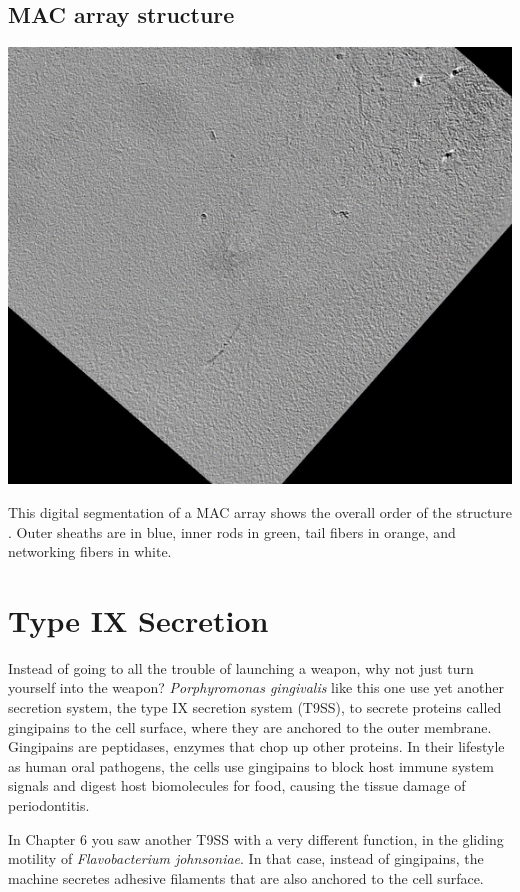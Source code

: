 \documentclass[]{tufte-book}
\begin{document}
\subsection{MAC array structure}\label{MAC_array_structure}

\includegraphics{img/schematics/9_7_2}

This digital segmentation of a MAC array shows the overall order of the
structure \citep{shikuma2014}. Outer sheaths are in blue, inner rods in
green, tail fibers in orange, and networking fibers in white.

\section{Type IX Secretion}\label{type-ix-secretion}

Instead of going to all the trouble of launching a weapon, why not just
turn yourself into the weapon? \emph{Porphyromonas gingivalis} like this
one use yet another secretion system, the type IX secretion system
(T9SS), to secrete proteins called gingipains to the cell surface, where
they are anchored to the outer membrane. Gingipains are peptidases,
enzymes that chop up other proteins. In their lifestyle as human oral
pathogens, the cells use gingipains to block host immune system signals
and digest host biomolecules for food, causing the tissue damage of
periodontitis.

In Chapter 6 you saw another T9SS with a very different function, in the
gliding motility of \emph{Flavobacterium johnsoniae}. In that case,
instead of gingipains, the machine secretes adhesive filaments that are
also anchored to the cell surface.
\end{document}
